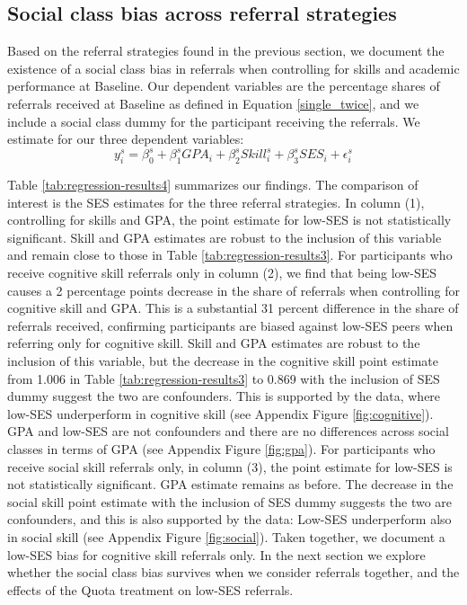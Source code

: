 \documentclass[11pt,a4paper,oneside]{article}
\begin{document}
\subsection*{Social class bias across referral strategies}
Based on the referral strategies found in the previous section, we document the existence of a social class bias in referrals when controlling for skills and academic performance at Baseline. Our dependent variables are the percentage shares of referrals received at Baseline as defined in Equation \ref{single_twice}, and we include a social class dummy for the participant receiving the referrals. We estimate for our three dependent variables:
  \begin{equation}\label{treat-ses}
y_{i}^{s} = \beta_{0}^{s} + \beta_1^{s}{GPA}_{i} + \beta_{2}^{s}{Skill}_{i}^{s} + \beta_3^{s}{SES}_{i} + \epsilon_{i}^{s}
\end{equation}
  
Table \ref{tab:regression-results4} summarizes our findings. The comparison of interest is the SES estimates for the three referral strategies. In column (1), controlling for skills and GPA, the point estimate for low-SES is not statistically significant. Skill and GPA estimates are robust to the inclusion of this variable and remain close to those in Table \ref{tab:regression-results3}. For participants who receive cognitive skill referrals only in column (2), we find that being low-SES causes a 2 percentage points decrease in the share of referrals when controlling for cognitive skill and GPA. This is a substantial 31 percent difference in the share of referrals received, confirming participants are biased against low-SES peers when referring only for cognitive skill. Skill and GPA estimates are robust to the inclusion of this variable, but the decrease in the cognitive skill point estimate from 1.006 in Table \ref{tab:regression-results3} to 0.869 with the inclusion of SES dummy suggest the two are confounders. This is supported by the data, where low-SES underperform in cognitive skill (see Appendix Figure \ref{fig:cognitive}). GPA and low-SES are not confounders and there are no differences across social classes in terms of GPA (see Appendix Figure \ref{fig:gpa}). For participants who receive social skill referrals only, in column (3), the point estimate for low-SES is not statistically significant. GPA estimate remains as before. The decrease in the social skill point estimate with the inclusion of SES dummy suggests the two are confounders, and this is also supported by the data: Low-SES underperform also in social skill (see Appendix Figure \ref{fig:social}). Taken together, we document a low-SES bias for cognitive skill referrals only. In the next section we explore whether the social class bias survives when we consider referrals together, and the effects of the Quota treatment on low-SES referrals.   
\end{document}
